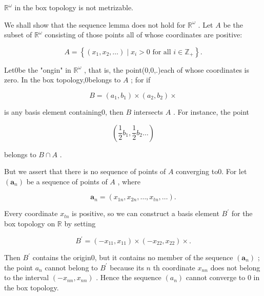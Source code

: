 \begin{example} \({\mathbb{R}}^{\omega }\) in the box topology is not metrizable.

We shall show that the sequence lemma does not hold for \({\mathbb{R}}^{\omega }\) . Let \(A\) be the subset of \({\mathbb{R}}^{\omega }\) consisting of those points all of whose coordinates are positive:

\[
A = \left\{  {\left( {{x}_{1},{x}_{2},\ldots }\right)  \mid  {x}_{i} > 0\text{ for all }i \in  {\mathbb{Z}}_{ + }}\right\}  .
\]

Let0be the "ongin" in \({\mathbb{R}}^{\omega }\) , that is, the point(0,0,.)each of whose coordinates is zero. In the box topology,0belongs to \(A\) ; for if

\[
B = \left( {{a}_{1},{b}_{1}}\right)  \times  \left( {{a}_{2},{b}_{2}}\right)  \times
\]

is any basis element containing0, then \(B\) intersects \(A\) . For instance, the point

\[
\left( {\frac{1}{2}{b}_{1},\frac{1}{2}{b}_{2}\ldots }\right)
\]

belongs to \(B \cap  A\) .

But we assert that there is no sequence of points of \(A\) converging to0. For let \(\left( {\mathbf{a}}_{n}\right)\) be a sequence of points of \(A\) , where

\[
{\mathbf{a}}_{n} = \left( {{x}_{1n},{x}_{2n},\ldots ,{x}_{tn},\ldots }\right) .
\]

Every coordinate \({x}_{tn}\) is positive, so we can construct a basis element \({B}^{\prime }\) for the box topology on \(\mathbb{R}\) by setting

\[
{B}^{\prime } = \left( {-{x}_{11},{x}_{11}}\right)  \times  \left( {-{x}_{22},{x}_{22}}\right)  \times  .
\]

Then \({B}^{\prime }\) contains the origin0, but it contains no member of the sequence \(\left( {\mathbf{a}}_{n}\right)\) ; the point \({a}_{n}\) cannot belong to \({B}^{\prime }\) because its \(n\) th coordinate \({x}_{nn}\) does not belong to the interval \(\left( {-{x}_{nn},{x}_{nn}}\right)\) . Hence the sequence \(\left( {a}_{n}\right)\) cannot converge to 0 in the box topology.
\end{example}

